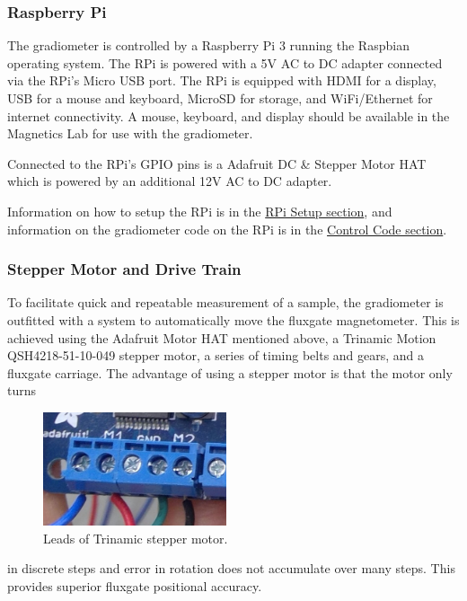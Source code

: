 \documentclass{TheMartianReport}
\begin{document}
\subsubsection{Raspberry Pi}
The gradiometer is controlled by a Raspberry Pi 3 running the Raspbian operating system. The RPi is powered with a 5V AC to DC adapter connected via the RPi's Micro USB port. The RPi is equipped with HDMI for a display, USB for a mouse and keyboard, MicroSD for storage, and WiFi/Ethernet for internet connectivity. A mouse, keyboard, and display should be available in the Magnetics Lab for use with the gradiometer.

Connected to the RPi's GPIO pins is a Adafruit DC \& Stepper Motor HAT which is powered by an additional 12V AC to DC adapter.

Information on how to setup the RPi is in the \hyperref[subsec:Rpi Setup]{RPi Setup section}, and information on the gradiometer code on the RPi is in the \hyperref[sec:ControlCode]{Control Code section}.

\subsubsection{Stepper Motor and Drive Train}
To facilitate quick and repeatable measurement of a sample, the gradiometer is outfitted with a system to automatically move the fluxgate magnetometer. This is achieved using the Adafruit Motor HAT mentioned above, a Trinamic Motion QSH4218-51-10-049 stepper motor, a series of timing belts and gears, and a fluxgate carriage. The advantage of using a stepper motor is that the motor only turns  \begin{figure}
	\centering
	\includegraphics[width=0.48\textwidth]{motor_leads}
	\caption{Leads of Trinamic stepper motor.}
	\label{fig:motor_leads}
\end{figure}in discrete steps and error in rotation does not accumulate over many steps. This provides superior fluxgate positional accuracy.
\end{document}
